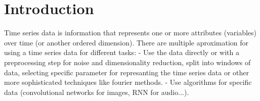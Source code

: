 
\newcommand{\estudiante}{García Justel, Alan}
\newcommand{\titulo}{MÁSTER EN INGENIERÍA COMPUTACIONAL Y SISTEMAS INTELIGENTES}
\newcommand{\asignatura}{INTRODUCTION TO TIME SERIES DATA}
\newcommand{\portada}{common/no_signal.png}
\newcommand{\colorportada}{title_green}
\newcommand{\curso}{2024-2025}



\newpage
\tableofcontents\thispagestyle{empty} \newpage

\section{Introduction}
Time series data is information that represents one or more attributes (variables) over time (or another ordered dimension).
There are multiple aproximation for using a time series data for different tasks:
- Use the data directly or with a preprocessing step for noise and dimensionality reduction, split into windows of data, selecting specific parameter for represanting the time series data or other more sophisticated techniques like fourier methods.
- Use algorithms for specific data (convolutional networks for images, RNN for audio...).



